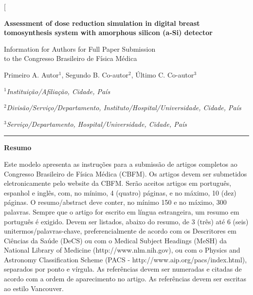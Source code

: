\documentclass[10pt,twoside,twocolumn]{article}
\begin{document}
\twocolumn[\vspace{40pt}
  \begin{@twocolumnfalse}
  
    \begin{flushright}

        \Large{
        \textbf{Assessment of dose reduction simulation in digital breast tomosynthesis system with amorphous silicon (a-Si) detector}
        }
        
        \Large{
        Information for Authors for Full Paper Submission\\
        to the Congresso Brasileiro de F\'{i}sica M\'{e}dica
        }
        
        \vspace{\baselineskip}
        
        \large{
        Primeiro A. Autor$^{1}$, Segundo B. Co-autor$^{2}$, \'{U}ltimo C. Co-autor$^{3}$\\
        }
        
       \vspace{\baselineskip}
       
       \normalsize{
        
        $^{1}$\textit{Institui\c{c}\~{a}o/Afilia\c{c}\~{a}o, Cidade, Pa\'{i}s}
        
        $^{2}$\textit{Divis\~{a}o/Servi\c{c}o/Departamento, Instituto/Hospital/Universidade, Cidade, Pa\'{i}s}
        
        $^{3}$\textit{Servi\c{c}o/Departamento, Hospital/Universidade, Cidade, Pa\'{i}s}
        
        }

    \end{flushright}



\noindent\rule{17.2cm}{0.4pt}
\textbf{Resumo}

Este modelo apresenta as instruções para a submissão de artigos completos ao Congresso Brasileiro de Física Médica (CBFM). Os artigos devem ser submetidos eletronicamente pelo website da CBFM. Serão aceitos artigos em português, espanhol e inglês, com, no mínimo, 4 (quatro) páginas, e no máximo, 10 (dez) páginas. O resumo/abstract deve conter, no mínimo 150 e no máximo, 300 palavras. Sempre que o artigo for escrito em língua estrangeira, um resumo em português é exigido. Devem ser listados, abaixo do resumo, de 3 (três) até 6 (seis) unitermos/palavras-chave, preferencialmente de acordo com os Descritores em Ciências da Saúde (DeCS) ou com o Medical Subject Headings (MeSH) da National Library of Medicine (http://www.nlm.nih.gov), ou com o Physics and Astronomy Classification Scheme (PACS - http://www.aip.org/pacs/index.html), separados por ponto e vírgula. As referências devem ser numeradas e citadas de acordo com a ordem de aparecimento no artigo. As referências devem ser escritas ao estilo Vancouver.


\end{@twocolumnfalse}
\end{document}
